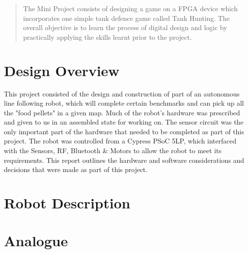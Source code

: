 \documentclass{article}
\begin{document}
\newpage

\maketitle

\begin{abstract}

The Mini Project consists of designing a game on a FPGA device which incorporates one simple tank defence game called Tank Hunting. The overall objective is to learn the process of digital design and logic by practically applying the skills learnt prior to the project.

\end{abstract}



\section{Design Overview}

This project consisted of the design and construction of part of an autonomous line following robot, which will complete certain benchmarks and can pick up all the "food pellets" in a given map. Much of the robot's hardware was prescribed and given to us in an assembled state for working on. The sensor circuit was the only important part of the hardware that needed to be completed as part of this project. The robot was controlled from a Cypress PSoC 5LP, which interfaced with the Sensors, RF, Bluetooth \&  Motors to allow the robot to meet its requirements. This report outlines the hardware and software considerations and decisions that were made as part of this project.

\section{Robot Description}


\section{Analogue}
\end{document}
